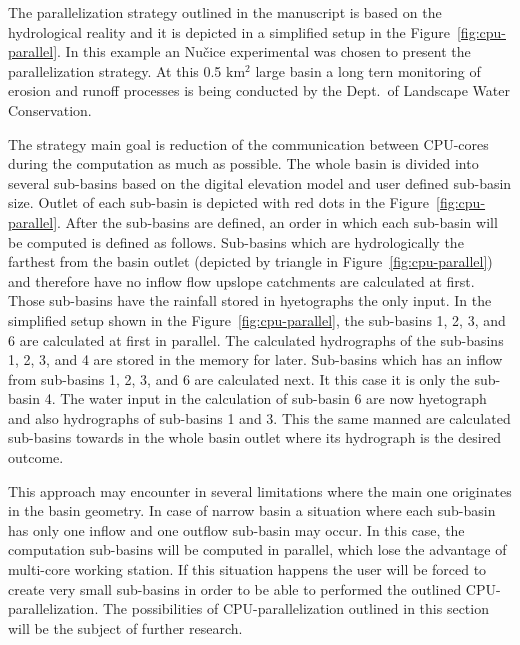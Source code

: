 The parallelization strategy outlined in the manuscript is based on
the hydrological reality and it is depicted in a simplified setup in
the Figure~\ref{fig:cpu-parallel}. In this example an Nučice experimental 
was chosen to present the parallelization strategy. At this 0.5 km$^2$ large 
basin a long tern monitoring of erosion and runoff processes is being conducted 
by the Dept.\ of Landscape Water Conservation. 

The strategy main goal is reduction of
the communication between CPU-cores during the computation as much as
possible. The whole basin is divided into several sub-basins based on
the digital elevation model and user defined sub-basin size. 
Outlet of each sub-basin is depicted with
red dots in the Figure~\ref{fig:cpu-parallel}. After the sub-basins
are defined, an order in which each sub-basin will be computed is defined as
follows. Sub-basins which are hydrologically the farthest from the
basin outlet (depicted by triangle in Figure~\ref{fig:cpu-parallel}) 
and therefore have no inflow flow upslope catchments are
calculated at first. Those sub-basins have the rainfall stored in
hyetographs the only input. In the simplified setup shown in the
Figure~\ref{fig:cpu-parallel}, the sub-basins 1, 2, 3, and 6 are
calculated at first in parallel. The calculated hydrographs of the
sub-basins 1, 2, 3, and 4 are stored in the memory for later. Sub-basins which
has an inflow from sub-basins 1, 2, 3, and 6 are calculated next. It
this case it is only the sub-basin 4. The water input in
the calculation of sub-basin 6 are now hyetograph and also hydrographs of
sub-basins 1 and 3. This the same manned are
calculated sub-basins towards in the whole basin outlet where its hydrograph 
is the desired outcome.

This approach may encounter in several limitations where the main one 
originates in the basin geometry. In case of narrow  basin a situation 
where each sub-basin has only one inflow and one outflow sub-basin may occur.
In this case, the computation sub-basins will be computed in parallel, which
lose the advantage of multi-core working station. If this situation happens
the user will be forced to create very small sub-basins in order to be able 
to performed the outlined CPU-parallelization. The possibilities of CPU-parallelization
outlined in this section will be the subject of further research.


